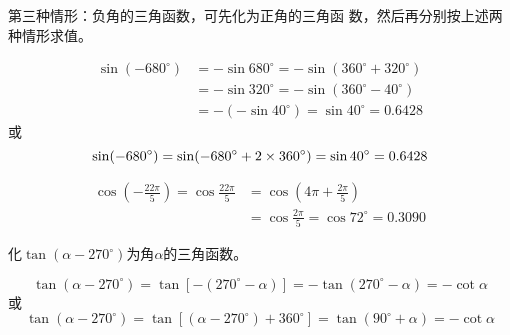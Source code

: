 第三种情形：负角的三角函数，可先化为正角的三角函
数，然后再分别按上述两种情形求值。

\begin{example}
\[\begin{split}
    \sin( -680^{\circ}) &= -\sin680^{\circ} =-\sin(360^{\circ}+320^{\circ})\\
   &=-\sin320^{\circ}
   =-\sin(360^{\circ}-40^{\circ})\\
  & =-(-\sin40^{\circ})   =\sin40^{\circ}=0.6428
\end{split}\]
或$$\sin( -680^{\circ})=\sin( -680^{\circ}+2\times 360^{\circ})=\sin 40^{\circ}=0.6428$$
\end{example}

\begin{example}
    \[\begin{split}
        \cos\left(-\frac{22\pi}{5}\right)=\cos\frac{22\pi}{5}&=\cos\left(4\pi+\frac{2\pi}{5}\right)\\ &=\cos\frac{2\pi}{5}=\cos72^{\circ}=0.3090
    \end{split}\]
\end{example}    


\begin{example}
    化$\tan (\alpha-270^{\circ})$为角$\alpha$的三角函数。
\end{example}

\begin{solution}
$$\tan (\alpha-270^{\circ})=\tan [-(270^{\circ}-\alpha)]
=-\tan (270^{\circ}-\alpha)
=-\cot \alpha$$
或
$$\tan (\alpha-270^{\circ})=\tan[ (\alpha-270^{\circ})+360^{\circ}]
=\tan (90^{\circ}+\alpha)=-\cot \alpha$$
\end{solution}

